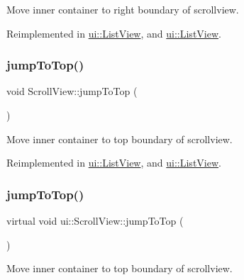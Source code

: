 Move inner container to right boundary of scrollview. 

Reimplemented in \hyperlink{classui_1_1ListView_aca7e4b44da940fdab188d7b713ada04a}{ui\+::\+List\+View}, and \hyperlink{classui_1_1ListView_a07a1265c424478b68dc7d691bd29dc85}{ui\+::\+List\+View}.

\mbox{\label{classui_1_1ScrollView_abdc304338a86f1fd0cea613fca25ffef}} 
\subsubsection{\texorpdfstring{jump\+To\+Top()}{jumpToTop()}\hspace{0.1cm}{\footnotesize\ttfamily [1/2]}}
{\footnotesize\ttfamily void Scroll\+View\+::jump\+To\+Top (\begin{DoxyParamCaption}{ }\end{DoxyParamCaption})\hspace{0.3cm}{\ttfamily [virtual]}}

Move inner container to top boundary of scrollview. 

Reimplemented in \hyperlink{classui_1_1ListView_ac816b897b329ca67365e8e3f31a5bf18}{ui\+::\+List\+View}, and \hyperlink{classui_1_1ListView_af3477294f3fc87bbc9aaa1bec3c86fd8}{ui\+::\+List\+View}.

\mbox{\label{classui_1_1ScrollView_a39f933df289a40b00050405c0978c2e5}} 
\subsubsection{\texorpdfstring{jump\+To\+Top()}{jumpToTop()}\hspace{0.1cm}{\footnotesize\ttfamily [2/2]}}
{\footnotesize\ttfamily virtual void ui\+::\+Scroll\+View\+::jump\+To\+Top (\begin{DoxyParamCaption}{ }\end{DoxyParamCaption})\hspace{0.3cm}{\ttfamily [virtual]}}

Move inner container to top boundary of scrollview. 

